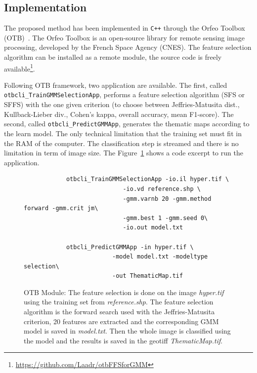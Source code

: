 \documentclass[journal]{IEEEtran}
\begin{document}
    \subsection{Implementation}
    \label{sec:otb-module}

    The proposed  method has been implemented  in \texttt{C++} through
    the  Orfeo  Toolbox (OTB)~\cite{christophe2008orfeo}.   The  Orfeo
    Toolbox  is  an  open-source  library  for  remote  sensing  image
    processing,  developed by  the  French Space  Agency (CNES).   The
    feature selection algorithm  can be installed as  a remote module,
    the           source            code           is           freely
    available\footnote{\url{https://github.com/Laadr/otbFFSforGMM}}.

    Following OTB framework, two application are available. The first,
    called  \texttt{otbcli\_TrainGMMSelectionApp}, performs  a feature
    selection algorithm (SFS or SFFS) with the one given criterion (to
    choose  between  Jeffries-Matusita  dist.,  Kullback-Lieber  div.,
    Cohen’s  kappa, overall  accuracy,  mean  F1-score).  The  second,
    called \texttt{otbcli\_PredictGMMApp}, generates the thematic maps
    according to the  learn model. The only  technical limitation that
    the  training set  must  fit  in the  RAM  of  the computer.   The
    classification step is streamed and there is no limitation in term
    of image  size. The Figure~\ref{fig:otb:ffs} shows  a code excerpt
    to run the application.

    \begin{figure}
        \centering
        \begin{verbatim}
            otbcli_TrainGMMSelectionApp -io.il hyper.tif \
                            -io.vd reference.shp \
                            -gmm.varnb 20 -gmm.method forward -gmm.crit jm\
                            -gmm.best 1 -gmm.seed 0\
                            -io.out model.txt

            otbcli_PredictGMMApp -in hyper.tif \
                         -model model.txt -modeltype selection\
                         -out ThematicMap.tif
        \end{verbatim}
        \caption{OTB Module: The feature selection is done on the image \emph{hyper.tif} using the training set from \emph{reference.shp}. The feature selection algorithm is the forward search used with the Jeffries-Matusita criterion, 20 features are extracted and the corresponding GMM model is saved in \emph{model.txt}. Then the whole image is classified using the model and the results is saved in the geotiff \emph{ThematicMap.tif}.}
        \label{fig:otb:ffs}
    \end{figure}
\end{document}
